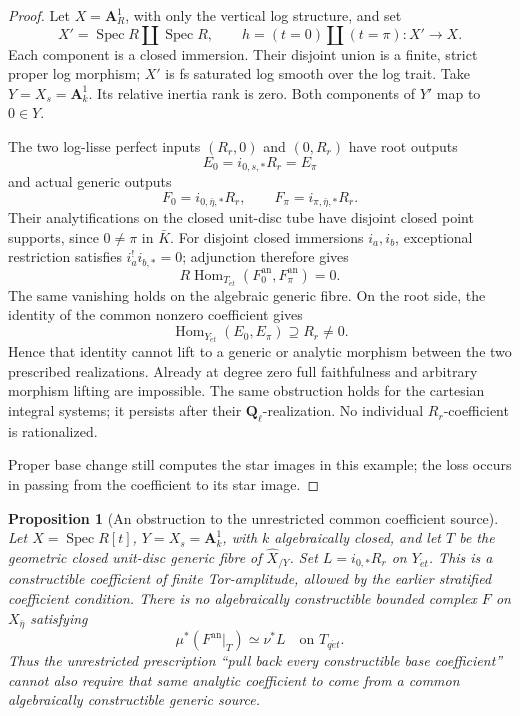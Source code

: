 \documentclass[11pt]{article}
\newtheorem{proposition}[theorem]{Proposition}
\theoremstyle{definition}
\theoremstyle{remark}
\begin{document}
\begin{proof}
Let $X=\mathbf A^1_R$, with only the vertical log structure, and set
\[
 X'=\operatorname{Spec}R\amalg\operatorname{Spec}R,
 \qquad h=(t=0)\amalg(t=\pi):X'\longrightarrow X.
\]
Each component is a closed immersion.  Their disjoint union is a
finite, strict proper log morphism; $X'$ is fs saturated log smooth
over the log trait.  Take $Y=X_s=\mathbf A^1_k$.
Its relative inertia rank is zero.  Both components of $Y'$ map
to $0\in Y$.

The two log-lisse perfect inputs $(R_r,0)$ and $(0,R_r)$ have root
outputs
\[
 E_0=i_{0,s,*}R_r=E_\pi
\]
and actual generic outputs
\[
 F_0=i_{0,\bar\eta,*}R_r,\qquad
 F_\pi=i_{\pi,\bar\eta,*}R_r.
\]
Their analytifications on the closed unit-disc tube have disjoint
closed point supports, since $0\ne\pi$ in $\bar K$.  For disjoint
closed immersions $i_a,i_b$, exceptional restriction satisfies
$i_a^!i_{b,*}=0$; adjunction therefore gives
\[
 R\operatorname{Hom}_{T_{\acute et}}(F_0^{\mathrm{an}},
                                      F_\pi^{\mathrm{an}})=0.
\]
The same vanishing holds on the algebraic generic fibre.  On the
root side, the identity of the common nonzero coefficient gives
\[
 \operatorname{Hom}_{Y_{\acute et}}(E_0,E_\pi)\supseteq R_r\ne0.
\]
Hence that identity cannot lift to a generic or analytic morphism
between the two prescribed realizations.  Already at degree zero
full faithfulness and arbitrary morphism lifting are impossible.
The same obstruction holds for the cartesian integral systems;
it persists after their $\mathbf Q_\ell$-realization.  No individual
$R_r$-coefficient is rationalized.

Proper base change still computes the star images in this example;
the loss occurs in passing from the coefficient to its star image.
\end{proof}

\begin{proposition}[An obstruction to the unrestricted common coefficient source]
\label{prop:frag-constructible-source-obstruction}
Let $X=\operatorname{Spec}R[t]$, $Y=X_s=\mathbf A^1_k$, with $k$
algebraically closed, and let $T$ be the geometric closed unit-disc
generic fibre of $\widehat X_{/Y}$.  Set
$L=i_{0,*}R_r$ on $Y_{\acute et}$.  This is a constructible coefficient
of finite Tor-amplitude, allowed by the earlier stratified coefficient
condition.  There is no algebraically constructible bounded complex
$F$ on $X_{\bar\eta}$ satisfying
\[
 \mu^*(F^{\mathrm{an}}|_T)\simeq\nu^*L
 \quad\text{on }T_{q\acute et}.
\]
Thus the unrestricted prescription ``pull back every constructible base
coefficient'' cannot also require that same analytic coefficient to
come from a common algebraically constructible generic source.
\end{proposition}
\end{document}
